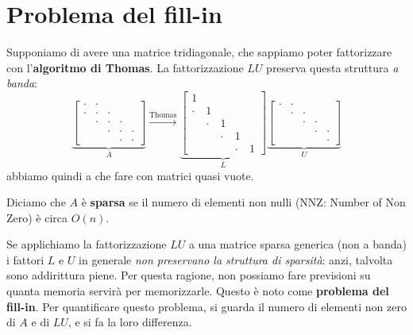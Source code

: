 \section{Problema del fill-in}
Supponiamo di avere una matrice tridiagonale, che sappiamo poter fattorizzare con l'\textbf{algoritmo di Thomas}.
La fattorizzazione $LU$ preserva questa struttura\textit{ a banda}:
\begin{equation*}
\underbrace{\begin{bmatrix}
\cdot  & \cdot  &  &  & \\
\cdot  & \cdot  & \cdot  &  & \\
 & \cdot  & \cdot  & \cdot  & \\
 &  & \cdot  & \cdot  & \cdot \\
 &  &  & \cdot  & \cdot
\end{bmatrix}}_{A}\xrightarrow{\text{Thomas}}\underbrace{\begin{bmatrix}
1 &  &  &  & \\
\cdot  & 1 &  &  & \\
 & \cdot  & 1 &  & \\
 &  & \cdot  & 1 & \\
 &  &  & \cdot  & 1
\end{bmatrix}}_{L}\underbrace{\begin{bmatrix}
\cdot  & \cdot  &  &  & \\
 & \cdot  & \cdot  &  & \\
 &  & \cdot  & \cdot  & \\
 &  &  & \cdot  & \cdot \\
 &  &  &  & \cdot
\end{bmatrix}}_{U}
\end{equation*}
abbiamo quindi a che fare con matrici quasi vuote.
\begin{definition}
Diciamo che $A$ è \textbf{sparsa} se il numero di elementi non nulli (NNZ: Number of Non Zero) è circa $O(n)$.
\end{definition}
Se applichiamo la fattorizzazione $LU$ a una matrice sparsa generica (non a banda) i fattori $L$ e $U$ in generale \textit{non preservano la struttura di sparsità}: anzi, talvolta sono addirittura piene.
Per questa ragione, non possiamo fare previsioni su quanta memoria servirà per memorizzarle.
Questo è noto come \textbf{problema del fill-in}.
Per quantificare questo problema, si guarda il numero di elementi non zero di $A$ e di $LU$, e si fa la loro differenza.

